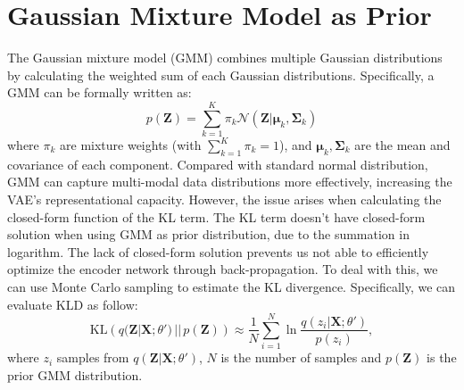\documentclass[a4paper]{article}
\begin{document}
\section{Gaussian Mixture Model as Prior}


The Gaussian mixture model (GMM) combines multiple Gaussian distributions by calculating the weighted sum of each Gaussian distributions. Specifically, a GMM can be formally written as: 
\begin{equation}
p(\mathbf{Z}) = \sum_{k=1}^K \pi_k \mathcal{N}(\mathbf{Z}|\boldsymbol{\mu}_k, \boldsymbol{\Sigma}_k)
\end{equation}
where $\pi_k$ are mixture weights (with $\sum_{k=1}^K \pi_k = 1$), and $\boldsymbol{\mu}_k, \boldsymbol{\Sigma}_k$ are the mean and covariance of each component. Compared with standard normal distribution, GMM can capture multi-modal data distributions more effectively, increasing the VAE's representational capacity. However, the issue arises when calculating the closed-form function of the KL term. The KL term doesn't have closed-form solution when using GMM as prior distribution, due to the summation in logarithm. The lack of closed-form solution prevents us not able to efficiently optimize the encoder network through back-propagation. To deal with this, we can use Monte Carlo sampling to estimate the KL divergence. Specifically, we can evaluate KLD as follow:
\begin{equation}
\text{KL}\left(q(\mathbf{Z}|\mathbf{X};\theta') \, || \, p(\mathbf{Z})\right) \approx \frac{1}{N}\sum_{i=1}^{N} \ln \frac{q(z_i|\mathbf{X};\theta')}{p(z_i)}, 
\end{equation}
where $z_i$ samples from $q(\mathbf{Z}|\mathbf{X};\theta')$, $N$ is the number of samples and $p(\mathbf{Z})$ is the prior GMM distribution.
\end{document}
